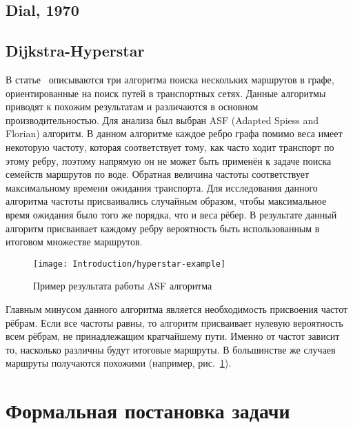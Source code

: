 \FloatBarrier

\subsection{Dial, 1970}


\FloatBarrier

\subsection{Dijkstra-Hyperstar}

В статье~\cite{mafast} описываются три алгоритма поиска нескольких
маршрутов в графе, ориентированные на поиск путей в транспортных
сетях. Данные алгоритмы приводят к похожим результатам и различаются в
основном производительностью. Для анализа был выбран ASF (Adapted
Spiess and Florian) алгоритм. В данном алгоритме каждое ребро графа
помимо веса имеет некоторую частоту, которая соответствует тому, как
часто ходит транспорт по этому ребру, поэтому напрямую он не может
быть применён к задаче поиска семейств маршрутов по воде. Обратная
величина частоты соответствует максимальному времени ожидания
транспорта. Для исследования данного алгоритма частоты присваивались
случайным образом, чтобы максимальное время ожидания было того же
порядка, что и веса рёбер. В результате данный алгоритм присваивает
каждому ребру вероятность быть использованным в итоговом множестве
маршрутов.


\begin{figure}
    \texttt{[image: Introduction/hyperstar-example]}
    \caption{Пример результата работы ASF алгоритма}
    \label{fig:asf}
\end{figure}

Главным минусом данного алгоритма является необходимость присвоения
частот рёбрам. Если все частоты равны, то алгоритм присваивает нулевую
вероятность всем рёбрам, не принадлежащим кратчайшему пути. Именно от
частот зависит то, насколько различны будут итоговые маршруты. В
большинстве же случаев маршруты получаются похожими (например,
рис.~\ref{fig:asf}).

\FloatBarrier

\section{Формальная постановка задачи}

